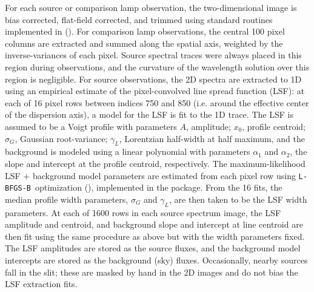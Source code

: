 \documentclass[modern, letterpaper]{aastex61}
\newcommand{\lbfgsb}{\texttt{L-BFGS-B}}
\begin{document}
For each source or comparison lamp observation, the two-dimensional image is
bias corrected, flat-field corrected, and trimmed using standard routines
implemented in  (\citealt{Craig:2015}).
For comparison lamp observations, the central 100 pixel columns are extracted
and summed along the spatial axis, weighted by the inverse-variances of each
pixel.
Source spectral traces were always placed in this region during observations,
and the curvature of the wavelength solution over this region is negligible.
For source observations, the 2D spectra are extracted to 1D using an empirical
estimate of the pixel-convolved line spread function (LSF): at each of 16 pixel
rows between indices 750 and 850 (i.e. around the effective center of the
dispersion axis), a model for the LSF is fit to the 1D trace.
The LSF is assumed to be a Voigt profile with parameters $A$, amplitude; $x_0$,
profile centroid; $\sigma_G$, Gaussian root-variance; $\gamma_L$, Lorentzian
half-width at half maximum, and the background is modeled using a linear
polynomial with parameters $\alpha_1$ and $\alpha_2$, the slope and intercept
at the profile centroid, respectively.
The maximum-likelihood LSF + background model parameters are estimated from
each pixel row using \lbfgsb\ optimization (\citealt{Zhu:1994}), implemented in
the  package.
From the 16 fits, the median profile width parameters, $\sigma_G$ and
$\gamma_L$, are then taken to be the LSF width parameters.
At each of 1600 rows in each source spectrum image, the LSF amplitude and
centroid, and background slope and intercept at line centroid are then fit using
the same procedure as above but with the width parameters fixed.
The LSF amplitudes are stored as the source fluxes, and the background model
intercepts are stored as the background (sky) fluxes.
Occasionally, nearby sources fall in the slit; these are masked by hand in the
2D images and do not bias the LSF extraction fits.
\end{document}

